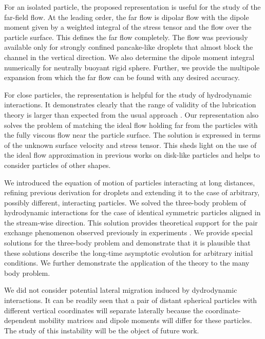 For an isolated particle, the proposed representation is useful for the study of the far-field flow. At the leading order, the far flow is dipolar flow with the dipole moment given by 
a weighted integral of the stress tensor and the flow over the particle
surface. This defines the far flow completely. The flow was previously available only for strongly confined pancake-like droplets that almost block the channel in the vertical direction.  We also determine the dipole moment integral
numerically for neutrally buoyant rigid sphere. Further, we provide the multipole expansion from which the far flow can be found with any desired accuracy.

For close particles, the representation is helpful for the study of hydrodynamic interactions. 
It demonstrates clearly that the range of validity of the lubrication theory is larger than expected from the usual
approach \citep{Batchelor,lubr,szeri,bruce}. Our representation  also solves the problem of matching the ideal flow holding far from the particles with the fully viscous flow near the particle surface. The solution is expressed in terms of
the unknown surface velocity and stress tensor. This sheds light on the use of the ideal flow approximation in previous works on disk-like particles \citep{tl2014,is} and helps to consider particles of other shapes.

We introduced the equation of motion of particles interacting at long distances, refining previous derivation for droplets \citep{tl2014} and extending it to the case of arbitrary, 
possibly different, interacting particles. We solved the three-body problem of hydrodynamic interactions for the case of identical symmetric particles aligned in the stream-wise 
direction. This solution provides theoretical support for the pair exchange phenomenon observed previously in experiments \citep{tab0}. We provide special solutions for the three-body problem and demonstrate that it is plausible that these solutions describe the long-time asymptotic evolution for arbitrary initial conditions. We further demonstrate the application of the theory to the many body problem.

We did not consider potential lateral migration induced by dydrodynamic interactions. It can be readily seen that a pair of distant spherical particles with different vertical coordinates will separate laterally because the coordinate-dependent mobility matrices and dipole moments will differ for these particles. The study of this instability will be the object of future work.

